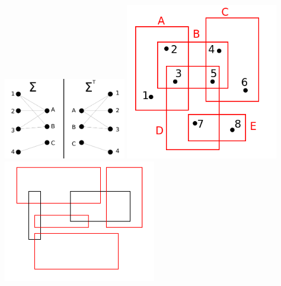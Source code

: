 \documentclass[11pt]{article}
\begin{document}
\includegraphics[width=0.4\textwidth]{./BipartiteGraph.png}
\clearpage%
\includegraphics[width=0.5\textwidth]{./RectanglePoints.png}
\clearpage%
\includegraphics[width=0.5\textwidth]{./RectangleIndySet.png}
\clearpage%
\end{document}
